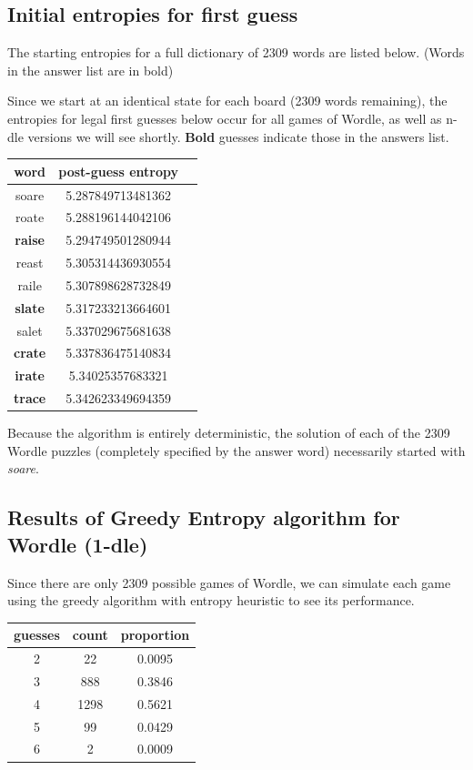 \documentclass[11pt, oneside]{article} 	%
\begin{document}
\subsection{Initial entropies for first guess}

The starting entropies for a full dictionary of 2309 words are listed below. (Words in the answer list are in bold)

Since we start at an identical state for each board (2309 words remaining), the entropies for legal first guesses below occur for all games of Wordle, as well as n-dle versions we will see shortly. \textbf{Bold} guesses indicate those in the answers list.
\begin{center}
\begin{tabular}{ |c|c|c| }
 \hline
word & post-guess entropy \\
\hline
soare & 5.287849713481362 \\
roate & 5.288196144042106 \\
\textbf{raise} & 5.294749501280944 \\
reast & 5.305314436930554 \\
raile & 5.307898628732849 \\
\textbf{slate} & 5.317233213664601 \\
salet & 5.337029675681638 \\
\textbf{crate} & 5.337836475140834 \\
\textbf{irate} & 5.34025357683321 \\
\textbf{trace} & 5.342623349694359 \\
\hline
\end{tabular}
\end{center}

Because the algorithm is entirely deterministic, the solution of each of the 2309 Wordle puzzles (completely specified by the answer word) necessarily started with \emph{soare}.

\subsection{Results of Greedy Entropy algorithm for Wordle (1-dle)}

Since there are only 2309 possible games of Wordle, we can simulate each game using the greedy algorithm with entropy heuristic to see its performance.

\begin{center}
\begin{tabular}{ |c|c|c| }
 \hline
guesses & count & proportion \\
 \hline
2 & 22 & 0.0095 \\
3 & 888 & 0.3846 \\
4 & 1298 & 0.5621 \\
5 & 99 & 0.0429 \\
6 & 2 & 0.0009 \\
 \hline
\end{tabular}
\end{center}
\end{document}
